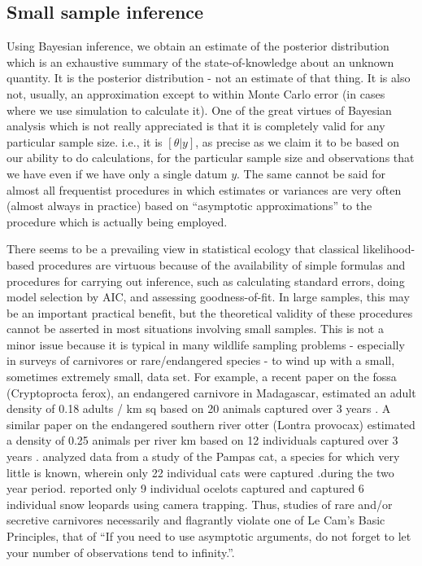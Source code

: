 \subsection{Small sample inference}

Using Bayesian inference, we obtain an estimate of the posterior
distribution which is an exhaustive summary of the state-of-knowledge
about an unknown quantity. It is the posterior distribution - not an
estimate of that thing. It is also not, usually, an approximation
except to within Monte Carlo error (in cases where we use simulation
to calculate it).  One of the great virtues of Bayesian analysis which
is not really appreciated is that it is completely valid for any
particular sample size. i.e., it is $[\theta|y]$, as precise as we
claim it to be based on our ability to do calculations, for the
particular sample size and observations that we have even if we have
only a single datum $y$.  The same cannot be said for almost all
frequentist procedures in which estimates or variances are very often
(almost always in practice) based on ``asymptotic approximations'' to
the procedure which is actually being employed.

There seems to be a prevailing view in statistical ecology that
classical likelihood-based procedures are virtuous because of the
availability of simple formulas and procedures for carrying out
inference, such as calculating standard errors, doing model selection
by AIC, and assessing goodness-of-fit.  In large samples, this may be
an important practical benefit, but the theoretical validity of these
procedures cannot be asserted in most situations involving small
samples.  This is not a minor issue because it is typical in many
wildlife sampling problems - especially in surveys of carnivores or
rare/endangered species - to wind up with a small, sometimes extremely
small, data set. For example, a recent paper on the fossa
(Cryptoprocta ferox), an endangered carnivore in Madagascar, estimated
an adult density of 0.18 adults / km sq based on 20 animals captured
over 3 years \citep{hawkins_racey:2005}. A similar paper on the
endangered southern river otter (Lontra provocax) estimated a density
of 0.25 animals per river km based on 12 individuals captured over 3
years \citep{sepulveda_etal:2007}. \citet{gardner_etal:2010} analyzed
data from a study of the Pampas cat, a species for which very little
is known, wherein only 22 individual cats were captured .during the
two year period.  \citet{trolle_kery:2005} reported only 9 individual
ocelots captured and \citet{jackson_etal:2006} captured 6 individual
snow leopards using camera trapping. Thus, studies of rare and/or
secretive carnivores necessarily and flagrantly violate one of Le
Cam's Basic Principles, that of ``If you need to use asymptotic
arguments, do not forget to let your number of observations tend to
infinity.''\citep{lecam:1990}.


